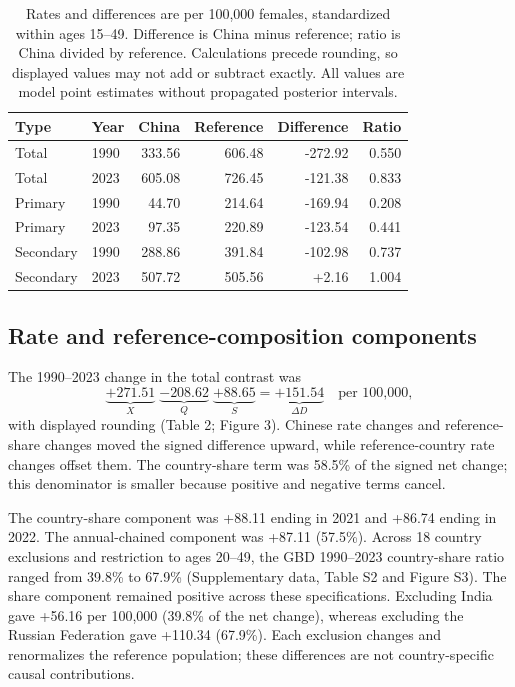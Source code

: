 \documentclass[11pt,a4paper]{article}
\begin{document}
\begin{table}[htbp]\centering\small{}
\caption{PCOS-attributed infertility rates and contrasts under contemporary GBD population shares.}\label{tab:pcos}
\begin{tabular}{llrrrr}\toprule
Type & Year & China & Reference & Difference & Ratio\\\midrule
Total & 1990 & 333.56 & 606.48 & -272.92 & 0.550\\
Total & 2023 & 605.08 & 726.45 & -121.38 & 0.833\\
Primary & 1990 & 44.70 & 214.64 & -169.94 & 0.208\\
Primary & 2023 & 97.35 & 220.89 & -123.54 & 0.441\\
Secondary & 1990 & 288.86 & 391.84 & -102.98 & 0.737\\
Secondary & 2023 & 507.72 & 505.56 & +2.16 & 1.004\\
\bottomrule
\end{tabular}
\caption*{Rates and differences are per 100,000 females, standardized within ages 15--49. Difference is China minus reference; ratio is China divided by reference. Calculations precede rounding, so displayed values may not add or subtract exactly. All values are model point estimates without propagated posterior intervals.}
\end{table}

\subsection{Rate and reference-composition components}
The 1990--2023 change in the total contrast was
\begin{equation}
 \underbrace{+271.51}_{X}\;\underbrace{-208.62}_{Q}\;\underbrace{+88.65}_{S}
 =\underbrace{+151.54}_{\Delta D}\quad\text{per 100,000},
\end{equation}
with displayed rounding (Table 2; Figure 3). Chinese rate changes and reference-share changes moved the signed difference upward, while reference-country rate changes offset them. The country-share term was 58.5\% of the signed net change; this denominator is smaller because positive and negative terms cancel.

The country-share component was +88.11 ending in 2021 and +86.74 ending in 2022. The annual-chained component was +87.11 (57.5\%). Across 18 country exclusions and restriction to ages 20--49, the GBD 1990--2023 country-share ratio ranged from 39.8\% to 67.9\% (Supplementary data, Table S2 and Figure S3). The share component remained positive across these specifications. Excluding India gave +56.16 per 100,000 (39.8\% of the net change), whereas excluding the Russian Federation gave +110.34 (67.9\%). Each exclusion changes and renormalizes the reference population; these differences are not country-specific causal contributions.
\end{document}
